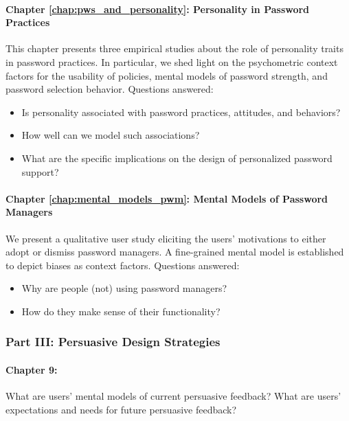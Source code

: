 \paragraph{Chapter \ref{chap:pws_and_personality}: Personality in Password Practices} %
This chapter presents three empirical studies about the role of personality traits in password practices. In particular, we shed light on the psychometric context factors for the usability of policies, mental models of password strength, and password selection behavior.
Questions answered: \vspace*{-5pt} \begin{itemize}[leftmargin=*,itemsep=-5pt]
	\item Is personality associated with password practices, attitudes, and behaviors?
	\item How well can we model such associations?
	\item What are the specific implications on the design of personalized password support?
\end{itemize}

\paragraph{Chapter \ref{chap:mental_models_pwm}: Mental Models of Password Managers} %
We present a qualitative user study eliciting the users' motivations to either adopt or dismiss password managers. A fine-grained mental model is established to depict biases as context factors.
Questions answered: \vspace*{-5pt} \begin{itemize}[leftmargin=*,itemsep=-5pt]
	\item Why are people (not) using password managers?
	\item How do they make sense of their functionality?
\end{itemize}

\subsubsection{Part III: Persuasive Design Strategies}
\paragraph{Chapter 9:} %
What are users' mental models of current persuasive feedback?
What are users' expectations and needs for future persuasive feedback?

